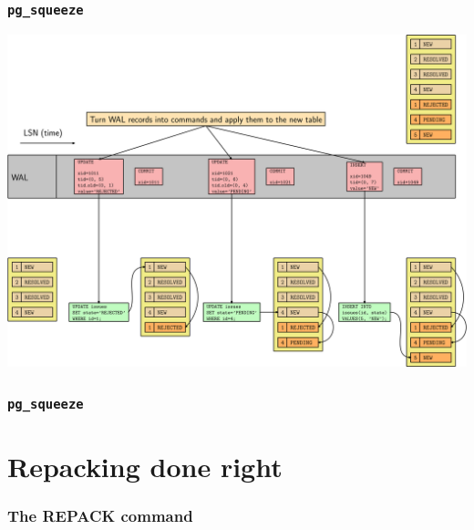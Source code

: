 \begin{frame}
  \frametitle{\texttt{pg\_squeeze}}
  \begin{center}
\includegraphics[height=\sizeforimages\textheight]{images/pg_squeeze_03.png}
  \end{center}
\end{frame}

\begin{frame}
        \frametitle{\texttt{pg\_squeeze}}
\end{frame}


\section{Repacking done right}
\begin{frame}
	\frametitle{The REPACK command}
\end{frame}


